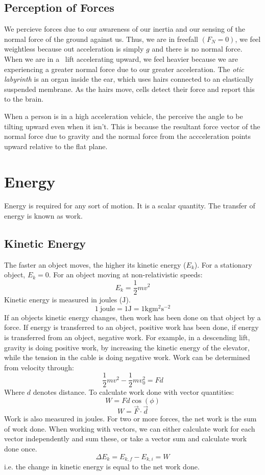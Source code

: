 \documentclass[12pt]{report}
\begin{document}
\begin{flushleft}
\subsection*{Perception of Forces}
We percieve forces due to our awareness of our inertia and our sensing of the normal
force of the ground against us. Thus, we are in freefall \((F_N = 0)\), we feel weightless
because out acceleration is simply \(g\) and there is no normal force. When we are in a \
lift accelerating upward, we feel heavier because we are experiencing a greater normal force
due to our greater acceleration. The \textit{otic labyrinth} is an organ inside the ear, which
uses hairs connected to an elastically suspended membrane. As the hairs move, cells detect their
force and report this to the brain.

\bigskip
When a person is in a high acceleration vehicle, the perceive the angle to be tilting upward 
even when it isn't. This is because the resultant force vector of the normal force due to gravity
and the normal force from the accceleration points upward relative to the flat plane.

\section*{Energy}
Energy is required for any sort of motion. It is a scalar quantity. The transfer of 
energy is known as work.

\subsection*{Kinetic Energy}
The faster an object moves, the higher its kinetic energy (\(E_k\)). For a stationary object,
\(E_k = 0\). For an object moving at non-relativistic speeds:
\[E_k = \frac{1}{2}mv^2\]
Kinetic energy is measured in joules (\(\mathrm{J}\)).
\[1 \:\mathrm{joule} = 1\mathrm{J} = 1\mathrm{kg}\mathrm{m}^2\mathrm{s}^{-2}\]
If an objects kinetic energy changes, then work has been done on that object by a force.
If energy is transferred to an object, positive work has been done, if energy is transferred
from an object, negative work. For example, in a descending lift, gravity is doing positive work,
by increasing the kinetic energy of the elevator, while the tension in the cable is doing negative
work. Work can be determined from velocity through:
\[\frac{1}{2}mv^2 - \frac{1}{2}mv_0^2 = Fd\]
Where \(d\) denotes distance. To calculate work done with vector quantities:
\[W = Fd\cos(\phi)\]
\[W = \vec{F}\cdot\vec{d}\]
Work is also measured in joules. For two or more forces, the net work is the sum
of work done. When working with vectors, we can either calculate work for each vector
independently and sum these, or take a vector sum and calculate work done once.
\[\Delta E_k = E_{k,f} - E_{k,i} = W\]
i.e. the change in kinetic energy is equal to the net work done.


\end{flushleft}
\end{document}
